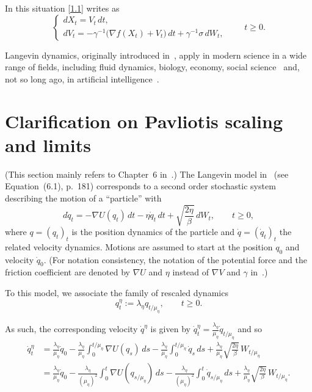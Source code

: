 \documentclass[11pt]{article}
\theoremstyle{remark}
\begin{document}
In this situation \eqref{1.1} writes as
\begin{equation}
\begin{cases}
dX_t = V_t\,dt,\\
dV_t = -\gamma^{-1}\big(\nabla f(X_t)+V_t\big)\,dt + \gamma^{-1}\sigma\,dW_t,
\end{cases}
\qquad t\ge0.
\tag{1.3}
\end{equation}

Langevin dynamics, originally introduced in~\cite{5}, apply in modern science in a wide range of fields,
including fluid dynamics, biology, economy, social science~\cite{7,6} and, not so long ago, in artificial intelligence~\cite{1}.

\section{Clarification on Pavliotis \cite{8} scaling and limits}

(This section mainly refers to Chapter~6 in~\cite{8}.)  
The Langevin model in~\cite{8} (see Equation~(6.1), p.~181) corresponds to a second order stochastic system describing the motion of a ``particle'' with
\[
d\dot{q}_t = -\nabla U(q_t)\,dt - \eta \dot{q}_t\,dt + \sqrt{\frac{2\eta}{\beta}}\,dW_t,
\qquad t\ge0,
\]
where $q=(q_t)_t$ is the position dynamics of the particle and $\dot{q}=(\dot{q}_t)_t$ the related velocity dynamics.
Motions are assumed to start at the position $q_0$ and velocity $\dot{q}_0$.
(For notation consistency, the notation of the potential force and the friction coefficient are denoted by $\nabla U$ and $\eta$
instead of $\nabla V$ and $\gamma$ in~\cite{8}.)

To this model, we associate the family of rescaled dynamics
\[
q_t^\eta := \lambda_\eta q_{t/\mu_\eta}, \qquad t\ge0.
\]

As such, the corresponding velocity $\dot{q}^\eta$ is given by
$\dot{q}_t^\eta = \frac{\lambda_\eta}{\mu_\eta}\dot{q}_{t/\mu_\eta}$ and so
\[
\begin{aligned}
\dot{q}_t^\eta
&= \frac{\lambda_\eta}{\mu_\eta}\dot{q}_0
 - \frac{\lambda_\eta}{\mu_\eta}\int_0^{t/\mu_\eta} \nabla U(q_s)\,ds
 - \frac{\lambda_\eta}{\mu_\eta}\int_0^{t/\mu_\eta} \dot{q}_s\,ds
 + \frac{\lambda_\eta}{\mu_\eta}\sqrt{\frac{2\eta}{\beta}}\,W_{t/\mu_\eta} \\
&= \frac{\lambda_\eta}{\mu_\eta}\dot{q}_0
 - \frac{\lambda_\eta}{(\mu_\eta)^2}\int_0^{t} \nabla U(q_{s/\mu_\eta})\,ds
 - \frac{\lambda_\eta}{(\mu_\eta)^2}\int_0^{t} \dot{q}_{s/\mu_\eta}\,ds
 + \frac{\lambda_\eta}{\mu_\eta}\sqrt{\frac{2\eta}{\beta}}\,W_{t/\mu_\eta}.
\end{aligned}
\]
\end{document}
